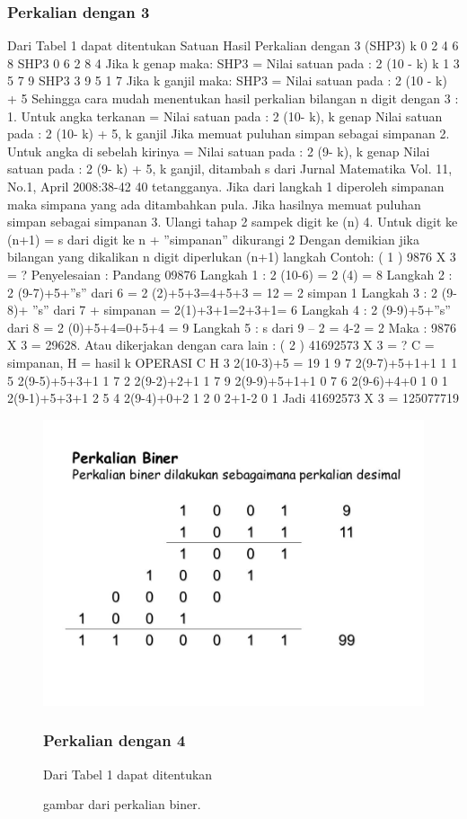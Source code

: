 \subsubsection{Perkalian dengan 3}
Dari Tabel 1 dapat ditentukan
Satuan Hasil Perkalian dengan 3 (SHP3)
k 0 2 4 6 8
SHP3 0 6 2 8 4
Jika k genap maka:
SHP3 = Nilai satuan pada : 2 (10 - k)
k 1 3 5 7 9
SHP3 3 9 5 1 7
Jika k ganjil maka:
SHP3 = Nilai satuan pada : 2 (10 - k) + 5
Sehingga cara mudah menentukan hasil
perkalian bilangan n digit dengan 3 :
1. Untuk angka terkanan =
Nilai satuan pada : 2 (10- k), k genap
Nilai satuan pada : 2 (10- k) + 5,
k ganjil
Jika memuat puluhan simpan sebagai
simpanan
2. Untuk angka di sebelah kirinya =
Nilai satuan pada : 2 (9- k), k genap
Nilai satuan pada : 2 (9- k) + 5,
k ganjil, ditambah s dari
Jurnal Matematika Vol. 11, No.1, April 2008:38-42
40
tetangganya.
Jika dari langkah 1 diperoleh
simpanan maka simpana yang ada
ditambahkan pula.
Jika hasilnya memuat puluhan simpan
sebagai simpanan
3. Ulangi tahap 2 sampek digit ke (n)
4. Untuk digit ke (n+1) =
s dari digit ke n + ”simpanan”
dikurangi 2
Dengan demikian jika bilangan yang
dikalikan n digit diperlukan (n+1) langkah
Contoh:
( 1 ) 9876 X 3 = ?
Penyelesaian : Pandang 09876
Langkah 1 : 2 (10-6) = 2 (4) = 8
Langkah 2 : 2 (9-7)+5+”s” dari 6
= 2 (2)+5+3=4+5+3 = 12
= 2 simpan 1
Langkah 3 : 2 (9-8)+
”s” dari 7 + simpanan
= 2(1)+3+1=2+3+1= 6
Langkah 4 : 2 (9-9)+5+”s” dari 8
= 2 (0)+5+4=0+5+4 = 9
Langkah 5 : s dari 9 – 2 = 4-2 = 2
Maka : 9876 X 3 = 29628.
Atau dikerjakan dengan cara lain :
( 2 ) 41692573 X 3 = ?
C = simpanan, H = hasil
k OPERASI C H
3 2(10-3)+5 = 19 1 9
7 2(9-7)+5+1+1 1 1
5 2(9-5)+5+3+1 1 7
2 2(9-2)+2+1 1 7
9 2(9-9)+5+1+1 0 7
6 2(9-6)+4+0 1 0
1 2(9-1)+5+3+1 2 5
4 2(9-4)+0+2 1 2
0 2+1-2 0 1
Jadi 41692573 X 3 = 125077719

\begin{figure}[ht]
	\centerline{\includegraphics[width=1\textwidth]{figures/perkalianbiner.jpg}}
	\caption{gambar dari perkalian biner.}
	\label{perkalian}

\subsubsection {Perkalian dengan 4}
Dari Tabel 1 dapat  ditentukan

\end{figure}
